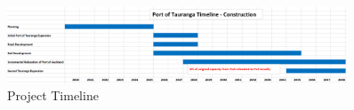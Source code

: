 \begin{figure}
\centering
\includegraphics[width=0.9\textwidth]{Timeline.png}
\centering
\caption{Project Timeline}
\end{figure}

\clearpage